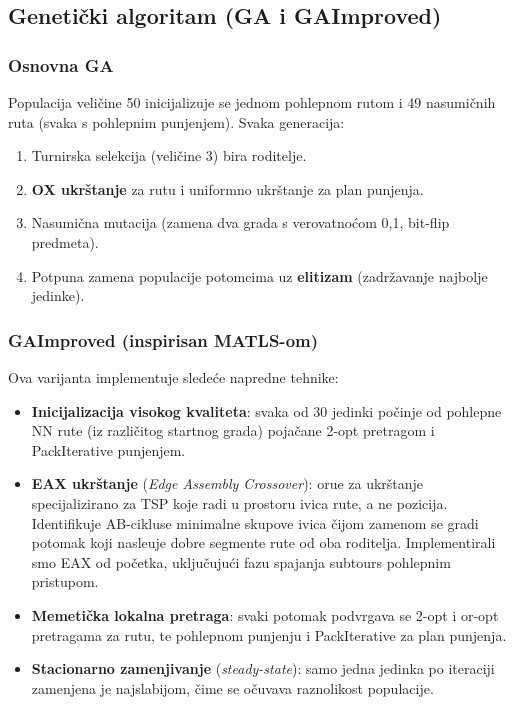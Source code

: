 \documentclass[12pt,a4paper]{article}
\begin{document}
\subsection{Genetički algoritam (GA i GAImproved)}

\subsubsection{Osnovna GA}

Populacija veli\v{c}ine 50 inicijalizuje se jednom pohlepnom rutom i 49 nasumi\v{c}nih ruta (svaka s pohlepnim punjenjem). Svaka generacija:
\begin{enumerate}
    \item Turnirska selekcija (veli\v{c}ine 3) bira roditelje.
    \item \textbf{OX ukrštanje} za rutu i uniformno ukrštanje za plan punjenja.
    \item Nasumi\v{c}na mutacija (zamena dva grada s verovatno\'{c}om 0{,}1, bit-flip predmeta).
    \item Potpuna zamena populacije potomcima uz \textbf{elitizam} (zadržavanje najbolje jedinke).
\end{enumerate}

\subsubsection{GAImproved (inspirisan MATLS-om)}

Ova varijanta implementuje slede\'{c}e napredne tehnike:
\begin{itemize}
    \item \textbf{Inicijalizacija visokog kvaliteta}: svaka od 30 jedinki po\v{c}inje od pohlepne NN rute (iz razli\v{c}itog startnog grada) poja\v{c}ane 2-opt pretragom i PackIterative punjenjem.
    \item \textbf{EAX ukrštanje} (\textit{Edge Assembly Crossover}): oru\dj{}e za ukrštanje specijalizirano za TSP koje radi u prostoru ivica rute, a ne pozicija. Identifikuje AB-cikluse minimalne skupove ivica \v{c}ijom zamenom se gradi potomak koji nasle\dj{}uje dobre segmente rute od oba roditelja. Implementirali smo EAX od po\v{c}etka, uklju\v{c}uju\'{c}i fazu spajanja subtours pohlepnim pristupom.
    \item \textbf{Memetička lokalna pretraga}: svaki potomak podvrgava se 2-opt i or-opt pretragama za rutu, te pohlepnom punjenju i PackIterative za plan punjenja.
    \item \textbf{Stacionarno zamenjivanje} (\textit{steady-state}): samo jedna jedinka po iteraciji zamenjena je najslabijom, \v{c}ime se o\v{c}uvava raznolikost populacije.
\end{itemize}
\end{document}
